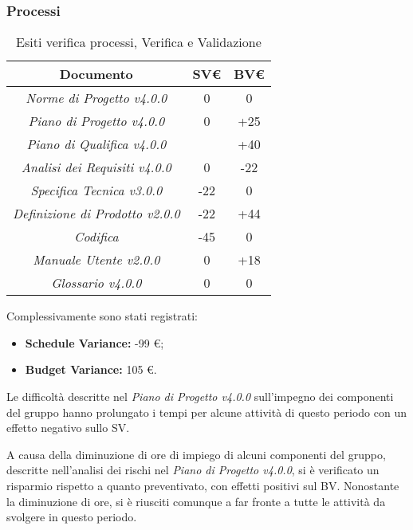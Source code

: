 \newpage

\subsubsection{Processi}
\label{appendice 9}
\vspace{3mm}

\begin{table}[h]
	\begin{tabular}{|c|c|c|}
		\toprule
		\textbf{Documento} & \textbf{SV\euro} & \textbf{BV\euro} \\ 
		\midrule
		\midrule
		\textit{Norme di Progetto v4.0.0} & 0 & 0 \\  
		\textit{Piano di Progetto v4.0.0} & 0 & +25 \\ 
		\textit{Piano di Qualifica v4.0.0} & & +40 \\ 
		\textit{Analisi dei Requisiti v4.0.0} & 0 & -22 \\
		\textit{Specifica Tecnica v3.0.0} & -22 & 0 \\ 
		\textit{Definizione di Prodotto v2.0.0} & -22 & +44 \\
		\textit{Codifica} & -45 & 0 \\
		\textit{Manuale Utente v2.0.0} & 0 & +18 \\
		\textit{Glossario v4.0.0} & 0 & 0 \\ 
		\bottomrule
	\end{tabular}
	\caption{Esiti verifica processi, Verifica e Validazione}
\end{table}

\noindent Complessivamente sono stati registrati:
\begin{itemize}
	\item \textbf{Schedule Variance:} -99 \euro;
	\item \textbf{Budget Variance:} 105 \euro.
\end{itemize}

\noindent Le difficoltà descritte nel \textit{Piano di Progetto v4.0.0} sull'impegno dei componenti del gruppo hanno prolungato i tempi per alcune attività di questo periodo con un effetto negativo sullo SV.

\noindent A causa della diminuzione di ore di impiego di alcuni componenti del gruppo, descritte nell'analisi dei rischi nel \textit{Piano di Progetto v4.0.0}, si è verificato un risparmio rispetto a quanto preventivato, con effetti positivi sul BV. Nonostante la diminuzione di ore, si è riusciti comunque a far fronte a tutte le attività da svolgere in questo periodo.  